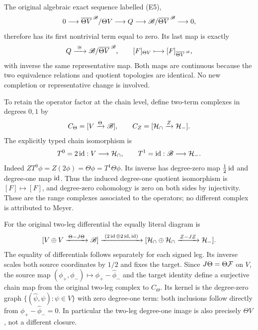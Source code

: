 \documentclass[11pt]{article}
\begin{document}
The original algebraic exact sequence labelled (E5),
\[
 0\longrightarrow
 \overline{\Theta V}^{\,\mathscr B}/\Theta V\longrightarrow Q
 \longrightarrow\mathscr B/\overline{\Theta V}^{\,\mathscr B}\longrightarrow0,
\]
therefore has its first nontrivial term equal to zero. Its last map
is exactly
\begin{equation}\label{ltheta:eq:E5}
 Q\xrightarrow{\ \cong\ }\mathscr B/\overline{\Theta V}^{\,\mathscr B},
 \qquad [F]_{\Theta V}\longmapsto[F]_{\overline{\Theta V}^{\,\mathscr B}},
\end{equation}
with inverse the same representative map. Both maps are continuous
because the two equivalence relations and quotient topologies are
identical. No new completion or representative change is involved.

To retain the operator factor at the chain level, define two-term
complexes in degrees $0,1$ by
\[
 C_\Theta=[V\xrightarrow{\Theta}\mathscr B],\qquad
 C_Z=[\mathcal H_\cap\xrightarrow{Z}\mathcal H_-].
\]
The explicitly typed chain isomorphism is
\begin{equation}\label{ltheta:eq:chain}
 T^0=2\operatorname{id}:V\longrightarrow\mathcal H_\cap,\qquad
 T^1=\operatorname{id}:\mathscr B\longrightarrow\mathcal H_-.
\end{equation}
Indeed $ZT^0\phi=Z(2\phi)=\Theta\phi=T^1\Theta\phi$.
Its inverse has degree-zero map $\tfrac12\operatorname{id}$ and degree-one map
$\operatorname{id}$. Thus the induced degree-one quotient isomorphism is
$[F]\mapsto[F]$, and degree-zero cohomology is zero on both sides
by injectivity. These are the range complexes associated to the
operators; no different complex is attributed to Meyer.

For the original two-leg differential the equally literal diagram is
\[
 [V\oplus V\xrightarrow{\,\Theta-J\Theta\,}\mathscr B]
 \xrightarrow{\ (2\operatorname{id}\oplus2\operatorname{id},\,\operatorname{id})\ }
 [\mathcal H_\cap\oplus\mathcal H_\cap\xrightarrow{\,Z-JZ\,}\mathcal H_-].
\]
The equality of differentials follows separately for each signed leg.
Its inverse scales both source coordinates by $1/2$ and fixes the
target. Since $J\Theta=\Theta\mathcal F$ on $V$, the source map
$(\phi_+,\phi_-)\mapsto\phi_+-\widehat\phi_-$ and the target identity
define a surjective chain map from the original two-leg complex to
$C_\Theta$. Its kernel is the degree-zero graph
$\{(\widehat\psi,\psi):\psi\in V\}$ with zero degree-one term:
both inclusions follow directly from
$\phi_+-\widehat\phi_-=0$. In particular the two-leg degree-one image
is also precisely $\Theta V$, not a different closure.
\end{document}
